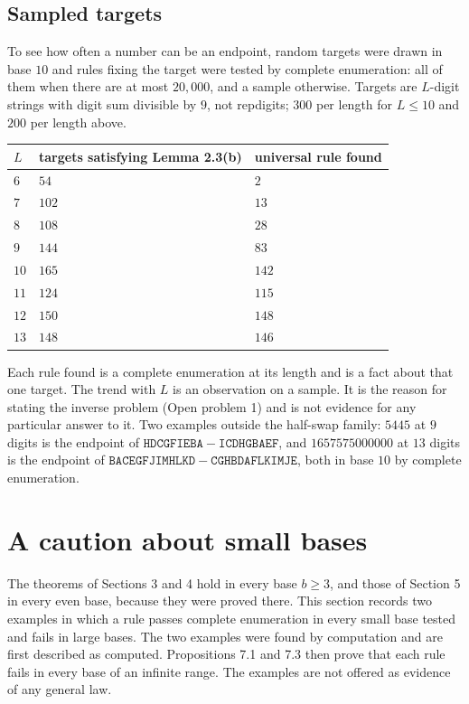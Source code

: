 \documentclass[11pt,letterpaper]{article}
\theoremstyle{paperstyle}
\theoremstyle{paperstyledef}
\theoremstyle{paperstylerem}
\begin{document}
\subsection{Sampled targets}\label{sampled-targets}

To see how often a number can be an endpoint, random targets were drawn in base \(10\) and rules fixing the target were tested by complete enumeration: all of them when there are at most \(20{,}000\), and a sample otherwise. Targets are \(L\)-digit strings with digit sum divisible by \(9\), not repdigits; \(300\) per length for \(L \leq 10\) and \(200\) per length above.

{\def\LTcaptype{none} %
\begin{longtable}[]{@{}lll@{}}
\toprule\noalign{}
\(L\) & targets satisfying Lemma 2.3(b) & universal rule found \\
\midrule\noalign{}
\endhead
\bottomrule\noalign{}
\endlastfoot
\(6\) & \(54\) & \(2\) \\
\(7\) & \(102\) & \(13\) \\
\(8\) & \(108\) & \(28\) \\
\(9\) & \(144\) & \(83\) \\
\(10\) & \(165\) & \(142\) \\
\(11\) & \(124\) & \(115\) \\
\(12\) & \(150\) & \(148\) \\
\(13\) & \(148\) & \(146\) \\
\end{longtable}
}

Each rule found is a complete enumeration at its length and is a fact about that one target. The trend with \(L\) is an observation on a sample. It is the reason for stating the inverse problem (Open problem 1) and is not evidence for any particular answer to it. Two examples outside the half-swap family: \(5445\) at \(9\) digits is the endpoint of \(\mathtt{HDCGFIEBA} - \mathtt{ICDHGBAEF}\), and \(1657575000000\) at \(13\) digits is the endpoint of \(\mathtt{BACEGFJIMHLKD} - \mathtt{CGHBDAFLKIMJE}\), both in base \(10\) by complete enumeration.

\section{A caution about small bases}\label{a-caution-about-small-bases}

The theorems of Sections 3 and 4 hold in every base \(b \geq 3\), and those of Section 5 in every even base, because they were proved there. This section records two examples in which a rule passes complete enumeration in every small base tested and fails in large bases. The two examples were found by computation and are first described as computed. Propositions 7.1 and 7.3 then prove that each rule fails in every base of an infinite range. The examples are not offered as evidence of any general law.
\end{document}
